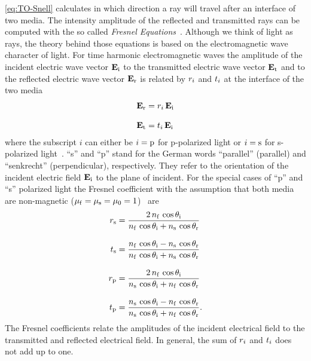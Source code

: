 \cref{eq:TO-Snell} calculates in which direction a ray will travel after an 
interface of two media. The intensity amplitude of the reflected and 
transmitted rays can be computed with the so called \emph{Fresnel 
Equations}~\cite{Jackson2013,Born1980Ch1}. Although we think of light as rays, 
the theory behind those equations is based on the electromagnetic wave 
character of light. For time harmonic electromagnetic waves the amplitude of 
the incident electric wave vector $\vb{E}_{\mathrm{i}}$ to the transmitted electric 
wave vector $\vb{E}_{\mathrm{t}}$ and to the reflected electric wave vector 
$\vb{E}_{\mathrm{r}}$ is related by $r_{i}$ and $t_{i}$ at the 
interface of the two media
\begin{subequations}
\begin{align}
  \vb{E}_{\mathrm{r}} & =r_{i}\,\vb{E}_{\mathrm{i}} \\[3mm]
  \vb{E}_{\mathrm{t}} & =t_{i}\,\vb{E}_{\mathrm{i}}
\end{align}
\end{subequations}
where the subscript $i$ can either be $i=\mathrm{p}$ for p-polarized light or 
$i=\mathrm{s}$ for s-polarized light~\cite{Jackson2013,Born1980Ch1}. ``s'' and 
``p'' stand for the German words ``parallel'' (parallel) and ``senkrecht'' 
(perpendicular), respectively. They refer to the orientation of the incident 
electric field $\vb{E}_{\mathrm{i}}$ to the plane of incident. For the special 
cases of ``p'' and ``s'' polarized light the Fresnel coefficient with the 
assumption that both media are non-magnetic ($\mu_{\mathrm{f}} = \mu_{\mathrm{s}} = 
\mu_{0} = 1$)~\cite{Born1980Ch1} are
\begin{subequations}
\begin{align}
  r_{\mathrm{s}} & =
  \frac{2\,n_{\mathrm{f}}\,\cos\theta_{\mathrm{i}}}{n_{\mathrm{f}}\,\cos\theta_{\mathrm{i}} + n_{\mathrm{s}}\,\cos\theta_{\mathrm{r}}} 
  \label{eq:TO-fresnel-rs}\\[3mm]
  t_{\mathrm{s}} & = \frac{n_{\mathrm{f}}\,\cos\theta_{\mathrm{i}} - 
  n_{\mathrm{s}}\,\cos\theta_{\mathrm{r}}}{n_{\mathrm{f}}\,\cos\theta_{\mathrm{i}} + n_{\mathrm{s}}\,\cos\theta_{\mathrm{r}}} 
  \label{eq:TO-fresnel-ts}\\[3mm]
  r_{\mathrm{p}} & =
  \frac{2\,n_{\mathrm{f}}\,\cos\theta_{\mathrm{i}}}{n_{\mathrm{s}}\,\cos\theta_{\mathrm{i}} + n_{\mathrm{f}}\,\cos\theta_{\mathrm{r}}} 
  \label{eq:TO-fresnel-rp}\\[3mm]
  t_{\mathrm{p}} & = \frac{n_{\mathrm{s}}\,\cos\theta_{\mathrm{i}} - 
  n_{\mathrm{f}}\,\cos\theta_{\mathrm{r}}}{n_{\mathrm{s}}\,\cos\theta_{\mathrm{i}} + n_{\mathrm{f}}\,\cos\theta_{\mathrm{r}}}.
\label{eq:TO-fresnel-tp}
\end{align}
\end{subequations}
The Fresnel coefficients relate the amplitudes of the incident electrical field 
to the transmitted and reflected electrical field. In general, the sum of 
$r_{i}$ and $t_{i}$ does not add up to one.

